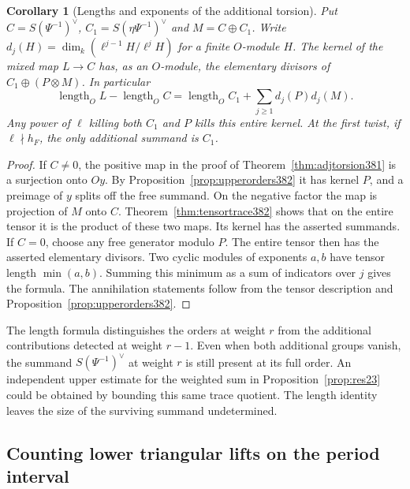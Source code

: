 \documentclass[a4paper,11pt]{article}
\newtheorem{corollary}[proposition]{Corollary}
\theoremstyle{definition}
\theoremstyle{remark}
\newcommand{\len}{\operatorname{length}}\newcommand{\Res}{\operatorname*{Res}}
\numberwithin{equation}{section}
\begin{document}
\begin{corollary}[Lengths and exponents of the additional torsion]
\label{cor:tensorexcess382}
Put \(C=S(\Psi^{-1})^\vee\), \(C_1=S(\eta\Psi^{-1})^\vee\)
and \(M=C\oplus C_1\). Write
\(d_j(H)=\dim_k(\ell^{j-1}H/\ell^j H)\) for a finite
\(O\)-module \(H\). The kernel of the mixed map \(L\to C\)
has, as an \(O\)-module, the elementary divisors of
\(C_1\oplus(P\otimes M)\). In particular
\[
 \len_O L-\len_O C
    =\len_O C_1+\sum_{j\ge1}d_j(P)d_j(M).
\]
Any power of \(\ell\) killing both \(C_1\) and \(P\) kills
this entire kernel. At the first twist, if \(\ell\nmid h_F\),
the only additional summand is \(C_1\).
\end{corollary}
\begin{proof}
If \(C\ne0\), the positive map in the proof of
Theorem~\ref{thm:adjtorsion381} is a surjection onto \(Oy\).
By Proposition~\ref{prop:upperorders382} it has kernel \(P\),
and a preimage of \(y\) splits off the free summand.
On the negative factor the map is projection of \(M\)
onto \(C\). Theorem~\ref{thm:tensortrace382} shows that
on the entire tensor it is the product of these two maps.
Its kernel has the asserted summands. If \(C=0\), choose
any free generator modulo \(P\). The entire tensor then
has the asserted elementary divisors. Two cyclic modules
of exponents \(a,b\) have tensor length \(\min(a,b)\).
Summing this minimum as a sum of indicators over \(j\)
gives the formula. The annihilation statements follow from
the tensor description and Proposition~\ref{prop:upperorders382}.
\end{proof}

The length formula distinguishes the orders at weight \(r\)
from the additional contributions detected at weight \(r-1\).
Even when both additional groups vanish, the summand
\(S(\Psi^{-1})^\vee\) at weight \(r\) is still present at
its full order. An independent upper estimate for the weighted sum
in Proposition~\ref{prop:res23} could be obtained by bounding this same
trace quotient. The length identity leaves the size of the surviving
summand undetermined.


\subsection{Counting lower triangular lifts on the period interval}
\label{sec:lowerfibers384}
\end{document}
